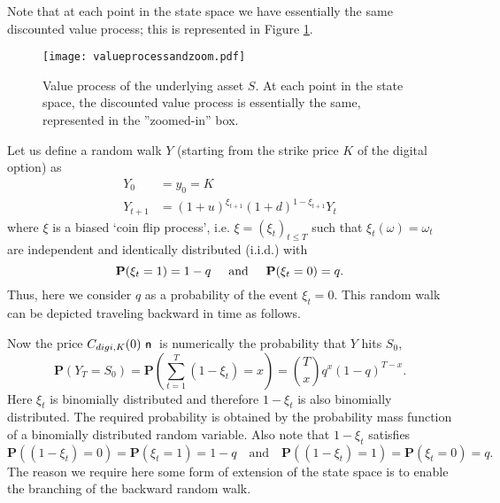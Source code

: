 \documentclass{amsart}
\theoremstyle{definition}
\theoremstyle{remark}
\newcommand{\n}{\!\!\ \nn \!\!\ }
\def\nn{\mathrel{%
    \mathchoice{\n}{\n}{\scriptsize\n}{\tiny\n}%
}}
\def\n {{%
    \setbox0\hbox{ \textsf{n}\!\  }%
    \rlap{\hbox to \wd0{\hss \!\ --\hss}}\box0
}}
\numberwithin{equation}{section}
\newcommand{\1}{\boldsymbol{1}}
\begin{document}
Note that at each point in the state space we have essentially the same discounted value process; this is represented in Figure \ref{figure:valueprocess}.


\begin{figure}[h!]
\begin{center}
\texttt{[image: valueprocessandzoom.pdf]}
\caption{Value process of the underlying asset $S$. At each point in the state space, the discounted value process is essentially the same, represented in the ''zoomed-in'' box.}
\label{figure:valueprocess}
\end{center}
\end{figure}





 Let us define a random walk $Y$ (starting from the strike price $K$ of the digital option) as
 \begin{equation*}
 \begin{split}
     Y_0&=y_0 =K\\
     Y_{t+1}&=(1+u)^{\xi_{t+1}}(1+d)^{1-\xi_{t+1}}Y_t
     \end{split}
 \end{equation*}
 where $\xi$ is a biased `coin flip process', i.e. $\xi=(\xi_t)_{t\leq T}$ such that $\xi_t(\omega)=\omega_t$ are independent and identically distributed (i.i.d.) with
 \[
 \mathbf{P}(\xi_t=1)=1-q \hspace{5mm} \text{and} \hspace{5mm} \mathbf{P}(\xi_t=0)=q.
 \]
 Thus, here we consider $q$ as a probability of the event $\xi_t=0$. This random walk can be depicted traveling backward in time as follows.
 



Now the price $C_{digi, K}(0)\n$ is numerically the probability that $Y$ hits $S_0$,
 \[
 \mathbf{P}(Y_T=S_0)=\mathbf{P}\left(\sum_{t=1}^T (1-\xi_t)=x\right)=\binom{T}{x}q^x(1-q)^{T-x}.
 \]
Here $\xi_t$ is binomially distributed and therefore $1-\xi_t$ is also binomially distributed. The required probability is obtained by the probability mass function of a binomially distributed random variable. Also note that $1-\xi_t$ satisfies 
\[\mathbf{P}((1-\xi_t)=0)=\mathbf{P}(\xi_t=1)=1-q\quad \text{and}\quad \mathbf{P}((1-\xi_t)=1)=\mathbf{P}(\xi_t=0)=q.\]
The reason we require here some form of extension of the state space is to enable the branching of the backward random walk.
\end{document}
